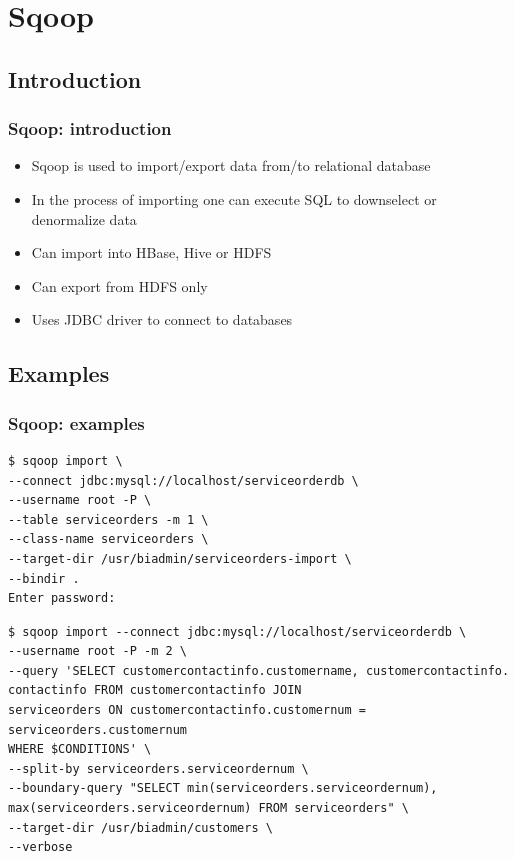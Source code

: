 \documentclass{beamer}
\begin{document}
\section{Sqoop}
\subsection{Introduction}
\begin{frame}
 \frametitle{Sqoop: introduction}
 
  \begin{itemize}
    \item Sqoop is used to import/export data from/to relational database
    \item In the process of importing one can execute SQL to downselect or denormalize data
    \item Can import into HBase, Hive or HDFS
    \item Can export from HDFS only
    \item Uses JDBC driver to connect to databases
  \end{itemize} 
\end{frame}

\subsection{Examples}
\begin{frame}[fragile]
 \frametitle{Sqoop: examples}
{\color{mycolorcli}
  \begin{lstlisting}[frame=single, basicstyle=\tiny]
$ sqoop import \
--connect jdbc:mysql://localhost/serviceorderdb \
--username root -P \
--table serviceorders -m 1 \
--class-name serviceorders \
--target-dir /usr/biadmin/serviceorders-import \
--bindir .
Enter password:
\end{lstlisting}

\begin{lstlisting}[frame=single, basicstyle=\tiny]
$ sqoop import --connect jdbc:mysql://localhost/serviceorderdb \
--username root -P -m 2 \
--query 'SELECT customercontactinfo.customername, customercontactinfo.
contactinfo FROM customercontactinfo JOIN
serviceorders ON customercontactinfo.customernum = serviceorders.customernum
WHERE $CONDITIONS' \
--split-by serviceorders.serviceordernum \
--boundary-query "SELECT min(serviceorders.serviceordernum),
max(serviceorders.serviceordernum) FROM serviceorders" \
--target-dir /usr/biadmin/customers \
--verbose
\end{lstlisting}

}

\end{frame}
\end{document}
